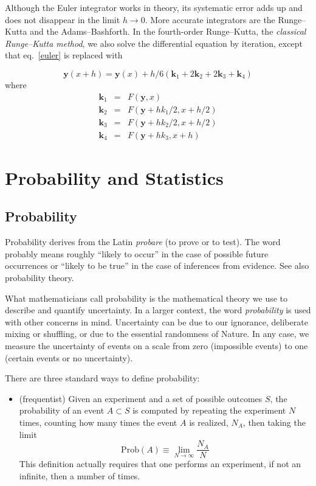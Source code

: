 \documentclass[justified, sixbynine]{tufte-book}
\theoremstyle{plain}%
\newtheorem * {corollary}{Corollary}
\theoremstyle{definition}
\theoremstyle{remark}
\newtheorem * {remark}{Remark}
\newtheorem * {note}{Note}
\begin{document}
\begin{fullwidth}
 Although the Euler integrator works in theory, its systematic error adds up and does not disappear in the limit $h\rightarrow 0$. More accurate integrators are the Runge--Kutta and the Adams--Bashforth. In the fourth-order Runge--Kutta, the {\it classical Runge--Kutta method}, we also solve the differential equation by iteration, except that eq.~\ref{euler} is replaced with

\begin{equation}
\mathbf{y}(x+h) = \mathbf{y}(x) + h/6 (\mathbf{k}_1+2\mathbf{k}_2+2\mathbf{k}_3+\mathbf{k}_4)\label{rungekatta}
\end{equation}
where
\begin{eqnarray}
\mathbf{k}_1 &=& F(\mathbf{y}, x) \\
\mathbf{k}_2 &=& F(\mathbf{y}+h k_1/2, x+h/2) \\
\mathbf{k}_3 &=& F(\mathbf{y}+h k_2/2, x+h/2) \\
\mathbf{k}_4 &=& F(\mathbf{y}+h k_3, x+h)
\end{eqnarray}

\chapter{Probability and Statistics}

\goodbreak\section{Probability}


Probability derives from the Latin {\it probare} (to prove or to test). The word
probably means roughly ``likely to occur'' in the case of possible future
occurrences or ``likely to be true'' in the case of inferences from
evidence. See also probability theory.

What mathematicians call probability is the mathematical theory we use to
describe and quantify uncertainty. In a larger context, the word {\it probability}
is used with other concerns in mind. Uncertainty can be due to our
ignorance, deliberate mixing or shuffling, or due to the essential
randomness of Nature. In any case, we measure the uncertainty of events on a
scale from zero (impossible events) to one (certain events or no
uncertainty).

There are three standard ways to define probability:

\begin{itemize}
\item  (frequentist) Given an experiment and a set of possible outcomes $S$, 
the probability of an event $A\subset S$ is computed by repeating the
experiment $N$ times, counting how many times the event $A$ is realized, $N_A
$, then taking the limit
\begin{equation}
\textrm{Prob}(A)\equiv \lim_{N\rightarrow \infty }\frac{N_A}N
\end{equation}
This definition actually requires that one performs an experiment, 
if not an infinite, then a number of times.


\end{itemize}
\end{fullwidth}
\end{document}
